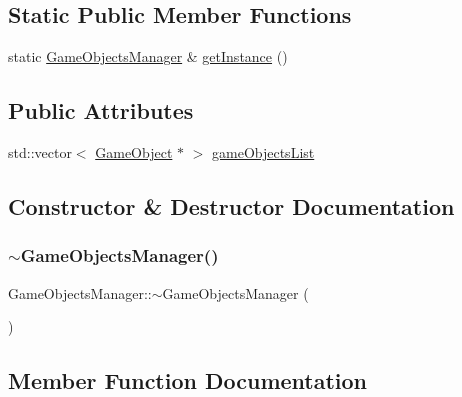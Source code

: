 \subsection*{Static Public Member Functions}
\begin{DoxyCompactItemize}
\item 
static \mbox{\hyperlink{class_game_objects_manager}{Game\+Objects\+Manager}} \& \mbox{\hyperlink{class_game_objects_manager_a905058214bee04ccfd466381261d4c0e}{get\+Instance}} ()
\end{DoxyCompactItemize}
\subsection*{Public Attributes}
\begin{DoxyCompactItemize}
\item 
std\+::vector$<$ \mbox{\hyperlink{class_game_object}{Game\+Object}} $\ast$ $>$ \mbox{\hyperlink{class_game_objects_manager_aafa6eaef65b0ecd6ce15d7ac3fcb2f0e}{game\+Objects\+List}}
\end{DoxyCompactItemize}


\subsection{Constructor \& Destructor Documentation}
\mbox{\label{class_game_objects_manager_abe5aece84355a01f2473b41217f28026}} 
\subsubsection{\texorpdfstring{$\sim$\+Game\+Objects\+Manager()}{~GameObjectsManager()}}
{\footnotesize\ttfamily Game\+Objects\+Manager\+::$\sim$\+Game\+Objects\+Manager (\begin{DoxyParamCaption}{ }\end{DoxyParamCaption})}



\subsection{Member Function Documentation}
\mbox{\label{class_game_objects_manager_acfdcf84bfdb4705920585b2d04bb874e}} 
